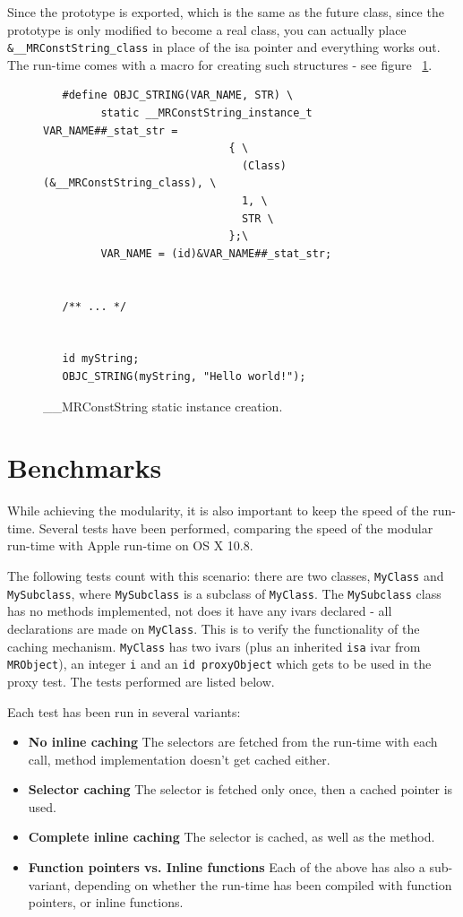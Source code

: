 Since the prototype is exported, which is the same as the future class, since the prototype is only modified to become a real class, you can actually place \verb=&__MRConstString_class= in place of the isa pointer and everything works out. The run-time comes with a macro for creating such structures - see figure ~\ref{fig:mr_const_str_creation}.

\begin{figure}[H]
  \begin{verbatim}
   #define OBJC_STRING(VAR_NAME, STR) \
         static __MRConstString_instance_t VAR_NAME##_stat_str = 
                             { \
                               (Class)(&__MRConstString_class), \
                               1, \
                               STR \
                             };\
         VAR_NAME = (id)&VAR_NAME##_stat_str;


   /** ... */
   
 
   id myString;
   OBJC_STRING(myString, "Hello world!");
   \end{verbatim}
  \centering{}
  \caption{\_\_MRConstString static instance creation.}
  \label{fig:mr_const_str_creation}
\end{figure}

\section{Benchmarks}

While achieving the modularity, it is also important to keep the speed of the run-time. Several tests have been performed, comparing the speed of the modular run-time with Apple run-time on OS X 10.8.

The following tests count with this scenario: there are two classes, \verb=MyClass= and \verb=MySubclass=, where \verb=MySubclass= is a subclass of \verb=MyClass=. The \verb=MySubclass= class has no methods implemented, not does it have any ivars declared - all declarations are made on \verb=MyClass=. This is to verify the functionality of the caching mechanism. \verb=MyClass= has two ivars (plus an inherited \verb=isa= ivar from \verb=MRObject=), an integer \verb=i= and an \verb=id proxyObject= which gets to be used in the proxy test. The tests performed are listed below.

Each test has been run in several variants:

\begin{itemize}
	\item{\bf{No inline caching}} The selectors are fetched from the run-time with each call, method implementation doesn't get cached either.
	\item{\bf{Selector caching}} The selector is fetched only once, then a cached pointer is used.
	\item{\bf{Complete inline caching}} The selector is cached, as well as the method.
	\item{\bf{Function pointers vs. Inline functions}} Each of the above has also a sub-variant, depending on whether the run-time has been compiled with function pointers, or inline functions.
\end{itemize}

